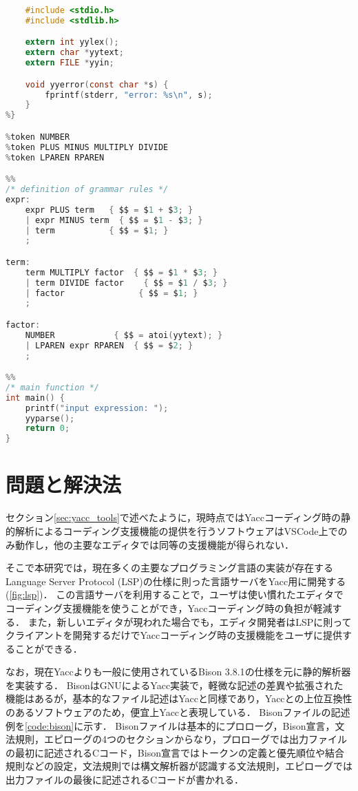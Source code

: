 \documentclass[fontsize=9bp,twocolumn,column_gap=2.36zw,a4paper,report]{jlreq}
\begin{document}
\begin{lstlisting}[caption=Bisonの記述例,label=code:bison,language=c]
%{
    #include <stdio.h>
    #include <stdlib.h>

    extern int yylex();
    extern char *yytext;
    extern FILE *yyin;

    void yyerror(const char *s) {
        fprintf(stderr, "error: %s\n", s);
    }
%}

%token NUMBER
%token PLUS MINUS MULTIPLY DIVIDE
%token LPAREN RPAREN

%%
/* definition of grammar rules */
expr:
    expr PLUS term   { $$ = $1 + $3; }
    | expr MINUS term  { $$ = $1 - $3; }
    | term           { $$ = $1; }
    ;

term:
    term MULTIPLY factor  { $$ = $1 * $3; }
    | term DIVIDE factor    { $$ = $1 / $3; }
    | factor               { $$ = $1; }
    ;

factor:
    NUMBER            { $$ = atoi(yytext); }
    | LPAREN expr RPAREN  { $$ = $2; }
    ;

%%
/* main function */
int main() {
    printf("input expression: ");
    yyparse();
    return 0;
}
\end{lstlisting}

\chapter{問題と解決法}\label{ch:probsolv}

セクション\ref{sec:yacc_tools}で述べたように，現時点ではYaccコーディング時の静的解析によるコーディング支援機能の提供を行うソフトウェアはVSCode上でのみ動作し，他の主要なエディタでは同等の支援機能が得られない．\par
そこで本研究では，現在多くの主要なプログラミング言語の実装が存在するLanguage Server Protocol (LSP)\cite{lsp}の仕様に則った言語サーバをYacc用に開発する(\ref{fig:lsp})．
この言語サーバを利用することで，ユーザは使い慣れたエディタでコーディング支援機能を使うことができ，Yaccコーディング時の負担が軽減する．
また，新しいエディタが現われた場合でも，エディタ開発者はLSPに則ってクライアントを開発するだけでYaccコーディング時の支援機能をユーザに提供することができる．\par
なお，現在Yaccよりも一般に使用されているBison 3.8.1\cite{bison}の仕様を元に静的解析器を実装する．
BisonはGNUによるYacc実装で，軽微な記述の差異や拡張された機能はあるが，基本的なファイル記述はYaccと同様であり，Yaccとの上位互換性のあるソフトウェアのため，便宜上Yaccと表現している．
Bisonファイルの記述例を\ref{code:bison}に示す．
Bisonファイルは基本的にプロローグ，Bison宣言，文法規則，エピローグの4つのセクションからなり，プロローグでは出力ファイルの最初に記述されるCコード，Bison宣言ではトークンの定義と優先順位や結合規則などの設定，文法規則では構文解析器が認識する文法規則，エピローグでは出力ファイルの最後に記述されるCコードが書かれる．
\newline
\end{document}
